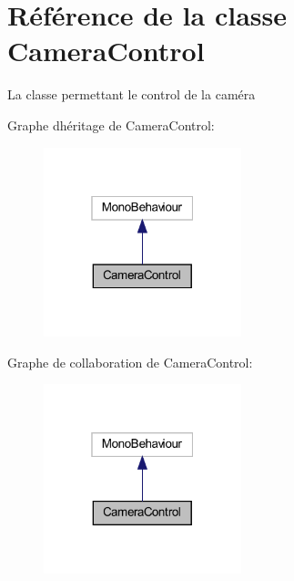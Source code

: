 \hypertarget{class_camera_control}{}\section{Référence de la classe Camera\+Control}
\label{class_camera_control}


La classe permettant le control de la caméra  




Graphe d\textquotesingle{}héritage de Camera\+Control\+:\nopagebreak
\begin{figure}[H]
\begin{center}
\leavevmode
\includegraphics[width=163pt]{class_camera_control__inherit__graph}
\end{center}
\end{figure}


Graphe de collaboration de Camera\+Control\+:\nopagebreak
\begin{figure}[H]
\begin{center}
\leavevmode
\includegraphics[width=163pt]{class_camera_control__coll__graph}
\end{center}
\end{figure}
